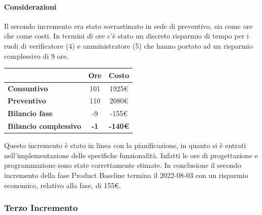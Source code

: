 \paragraph{Considerazioni} \hfill \break
Il secondo incremento era stato sovrastimato in sede di preventivo, sia come ore che come costi. In termini di ore c'è stato un discreto risparmio di tempo per i ruoli di verificatore (4) e amministratore (5) che hanno portato ad un risparmio complessivo di 9 ore.
\begin{center}
	\renewcommand{\arraystretch}{1.8}
	\begin{tabular}{ | l |c|c| }
    \hline
    & \textbf{Ore} & \textbf{Costo} \\
	\hline
    \textbf{Consuntivo} & 101 & 1925\euro \\
    \hline
    \textbf{Preventivo} & 110 & 2080\euro \\
    \hline
    \textbf{Bilancio fase} & -9 & -155\euro \\
    \hline
    \textbf{Bilancio complessivo} & \textbf{-1} & \textbf{-140\euro} \\
    \hline
    \end{tabular}
\end{center}
Questo incremento è stato in linea con la pianificazione, in quanto si è entrati nell'implementazione delle specifiche funzionalità. Infatti le ore di progettazione e programmazione sono state correttamente stimate. 
In conclusione il secondo incremento della fase Product Baseline termina il 2022-08-03 con un risparmio economico, relativo alla fase, di 155€.

\subsubsection{Terzo Incremento}

